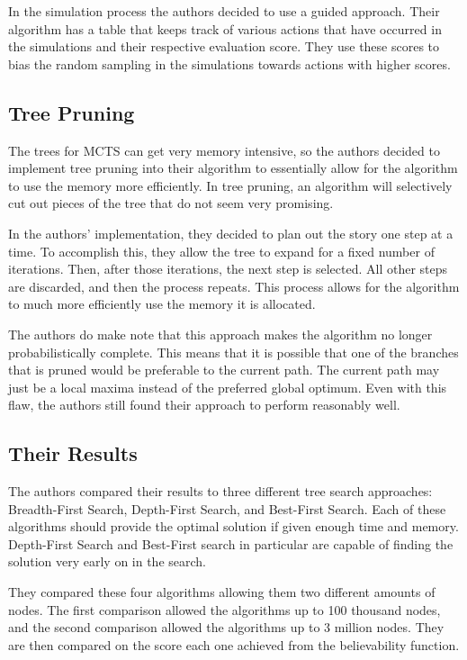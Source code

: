\documentclass{sig-alternate}
\begin{document}
In the simulation process the authors decided to use a guided approach. Their algorithm has a table that keeps track of various actions that have occurred in the simulations and their respective evaluation score. They use these scores to bias the random sampling in the simulations towards actions with higher scores. 
\subsection{Tree Pruning}
The trees for MCTS can get very memory intensive, so the authors decided to implement tree pruning into their algorithm to essentially allow for the algorithm to use the memory more efficiently. In tree pruning, an algorithm will selectively cut out pieces of the tree that do not seem very promising. 

In the authors' implementation, they decided to plan out the story one step at a time. To accomplish this, they allow the tree to expand for a fixed number of iterations. Then, after those iterations, the next step is selected. All other steps are discarded, and then the process repeats. This process allows for the algorithm to much more efficiently use the memory it is allocated.

The authors do make note that this approach makes the algorithm no longer probabilistically complete. This means that it is possible that one of the branches that is pruned would be preferable to the current path. The current path may just be a local maxima instead of the preferred global optimum. Even with this flaw, the authors still found their approach to perform reasonably well. 

\subsection{Their Results}
The authors compared their results to three different tree search approaches: Breadth-First Search, Depth-First Search, and Best-First Search\cite{Narrative}. Each of these algorithms should provide the optimal solution if given enough time and memory. Depth-First Search and Best-First search in particular are capable of finding the solution very early on in the search.

They compared these four algorithms allowing them two different amounts of nodes. The first comparison allowed the algorithms up to 100 thousand nodes, and the second comparison allowed the algorithms up to 3 million nodes. They are then compared on the score each one achieved from the believability function.
\end{document}
